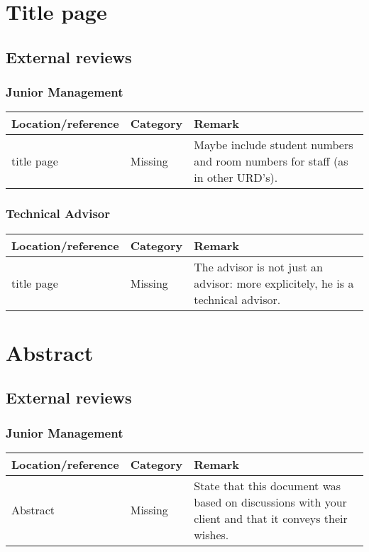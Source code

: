 
\section{Title page}

\subsection{External reviews}
\subsubsection*{Junior Management}
\begin{longtable}{l|l|p{}}
Location/reference & Category & Remark\\
\hline
\hline
\endhead
\hline
\endfoot
title page & Missing & Maybe include student numbers and room numbers for staff (as in other URD's). \\
\end{longtable}

\subsubsection*{Technical Advisor}
\begin{longtable}{l|l|p{}}
Location/reference & Category & Remark\\
\hline
\hline
\endhead
\hline
\endfoot
title page & Missing & The advisor is not just an advisor: more explicitely, he is a technical advisor. \\
\end{longtable}

\section{Abstract}

\subsection{External reviews}

\subsubsection*{Junior Management}
\begin{longtable}{l|l|p{}}
Location/reference & Category & Remark\\
\hline
\hline
\endhead
\hline
\endfoot
Abstract & Missing & State that this document was based on discussions with your client and that it conveys their wishes. \\
\end{longtable}

